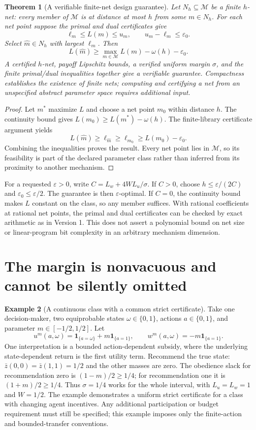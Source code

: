 \documentclass[11pt]{article}
\newtheorem{theorem}{Theorem}
\theoremstyle{definition}
\newtheorem{example}[theorem]{Example}
\theoremstyle{remark}
\begin{document}
\begin{theorem}[A verifiable finite-net design guarantee]
Let $N_h\subseteq\mathcal M$ be a finite $h$-net: every member of
$\mathcal M$ is at distance at most $h$ from some $m\in N_h$.
For each net point suppose the primal and dual certificates give
\[
 \ell_m\leq L(m)\leq u_m,\qquad u_m-\ell_m\leq\varepsilon_0.
\]
Select $\widehat m\in N_h$ with largest $\ell_m$. Then
\[
 L(\widehat m)\geq\max_{m\in\mathcal M}L(m)
                       -\omega(h)-\varepsilon_0.
\]
A certified $h$-net, payoff Lipschitz bounds, a verified uniform margin
$\sigma$, and the finite primal/dual inequalities together give a
verifiable guarantee. Compactness establishes the existence of finite
nets; computing and certifying a net from an unspecified abstract
parameter space requires additional input.
\end{theorem}
\begin{proof}
Let $m^*$ maximize $L$ and choose a net point $m_0$ within distance
$h$. The continuity bound gives $L(m_0)\geq L(m^*)-\omega(h)$.
The finite-library certificate argument yields
\[
 L(\widehat m)\geq\ell_{\widehat m}\geq\ell_{m_0}
     \geq L(m_0)-\varepsilon_0.
\]
Combining the inequalities proves the result. Every net point lies in
$\mathcal M$, so its feasibility is part of the declared parameter
class rather than inferred from its proximity to another mechanism.
\end{proof}

For a requested $\varepsilon>0$, write
$C=L_w+4WL_u/\sigma$. If $C>0$, choose
$h\leq\varepsilon/(2C)$ and $\varepsilon_0\leq\varepsilon/2$.
The guarantee is then $\varepsilon$-optimal. If $C=0$, the continuity
bound makes $L$ constant on the class, so any member suffices. With
rational coefficients at rational net points, the primal and dual
certificates can be checked by exact arithmetic as in Version 1.
This does not assert a polynomial bound on net size or linear-program
bit complexity in an arbitrary mechanism dimension.

\section{The margin is nonvacuous and cannot be silently omitted}
\begin{example}[A continuous class with a common strict certificate]
Take one decision-maker, two equiprobable states $\omega\in\{0,1\}$,
actions $a\in\{0,1\}$, and parameter $m\in[-1/2,1/2]$. Let
\[
 u^m(a,\omega)=\mathbf1_{\{a=\omega\}}+m\mathbf1_{\{a=1\}},
 \qquad w^m(a,\omega)=-m\mathbf1_{\{a=1\}}.
\]
One interpretation is a bounded action-dependent subsidy, where the
underlying state-dependent return is the first utility term. Recommend
the true state: $\bar z(0,0)=\bar z(1,1)=1/2$ and the other masses
are zero. The obedience slack for recommendation zero is
$(1-m)/2\geq1/4$; for recommendation one it is
$(1+m)/2\geq1/4$. Thus $\sigma=1/4$ works for the whole interval,
with $L_u=L_w=1$ and $W=1/2$. The example demonstrates a uniform strict
certificate for a class with changing agent incentives. Any additional
participation or budget requirement must still be specified; this
example imposes only the finite-action and bounded-transfer conventions.
\end{example}
\end{document}
